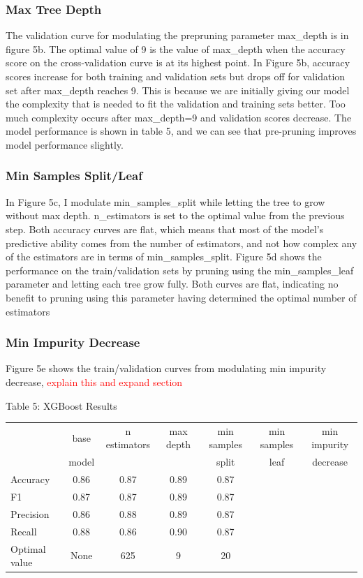 \documentclass{article}
\newcommand\todo[1]{\textcolor{red}{#1}}
\begin{document}
\subsubsection*{Max Tree Depth}
The validation curve for modulating the prepruning parameter max\_depth is in figure 5b. The optimal value of 9 is the value of max\_depth when the accuracy score on the cross-validation curve is at its highest point. In Figure 5b, accuracy scores increase for both training and validation sets but drops off for validation set after max\_depth reaches 9. This is because we are initially giving our model the complexity that is needed to fit the validation and training sets better. Too much complexity occurs after max\_depth=9 and validation scores decrease. The model performance is shown in table 5, and we can see that pre-pruning improves model performance slightly. 

\subsubsection*{Min Samples Split/Leaf}
In Figure 5c, I modulate min\_samples\_split while letting the tree to grow without max depth. n\_estimators is set to the optimal value from the previous step. Both accuracy curves are flat, which means that most of the model's predictive ability comes from the number of estimators, and not how complex any of the estimators are in terms of min\_samples\_split. Figure 5d shows the performance on the train/validation sets by pruning using the min\_samples\_leaf parameter and letting each tree grow fully. Both curves are flat, indicating no benefit to pruning using this parameter having determined the optimal number of estimators

\subsubsection*{Min Impurity Decrease}
Figure 5e shows the train/validation curves from modulating min impurity decrease, \todo{explain this and expand section}

\begin{table}
	
	\centering
	Table 5: XGBoost Results \\
	\begin{tabular}{ l c c c c c c }
		\hline
		& base & n estimators & max depth & min samples & min samples & min impurity\\
		& model & & & split & leaf & decrease \\
		\hline
		Accuracy & 0.86 & 0.87 & 0.89 & 0.87 && \\
		F1 & 0.87 & 0.87 & 0.89 & 0.87 & &\\
		Precision & 0.86 & 0.88 & 0.89 & 0.87 && \\
		Recall & 0.88 & 0.86 & 0.90 & 0.87 && \\
		Optimal value & None & 625 & 9 & 20 & & \\

		
		\hline 
	\end{tabular}
\end{table}
\end{document}
